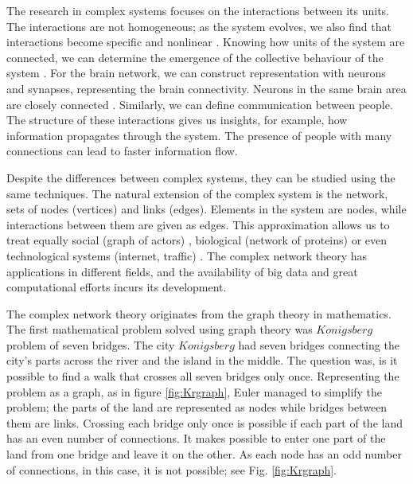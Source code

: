 The research in complex systems focuses on the interactions between its units. The interactions are not homogeneous; as the system evolves, we also find that interactions become specific and nonlinear \cite{thurner2018}. Knowing how units of the system are connected, we can determine the emergence of the collective behaviour of the system \cite{ladyman2013}. For the brain network, we can construct representation with neurons and synapses, representing the brain connectivity. Neurons in the same brain area are closely connected \cite{latora2017complex}.
Similarly, we can define communication between people. The structure of these interactions gives us insights, for example, how information propagates through the system. The presence of people with many connections can lead to faster information flow. 

Despite the differences between complex systems, they can be studied using the same techniques. The natural extension of the complex system is the network, sets of nodes (vertices) and links (edges). Elements in the system are nodes, while interactions between them are given as edges. This approximation allows us to treat equally social \cite{myers2014, sarigol2014} (graph of actors) , biological (network of proteins) \cite{fraiman2009ising, schneider2011modeling} or even technological systems (internet, traffic) \cite{costa2007characterization, costa2011analyzing, newman2003structure}. The complex network theory has applications in different fields, and the availability of big data and great computational efforts incurs its development. 

The complex network theory originates from the graph theory in mathematics. 
The first mathematical problem solved using graph theory was $Konigsberg$ problem of seven bridges. The city $Konigsberg$ had seven bridges connecting the city's parts across the river and the island in the middle. The question was, is it possible to find a walk that crosses all seven bridges only once. Representing the problem as a graph, as in figure \ref{fig:Krgraph}, Euler managed to simplify the problem; the parts of the land are represented as nodes while bridges between them are links. Crossing each bridge only once is possible if each part of the land has an even number of connections. It makes possible to enter one part of the land from one bridge and leave it on the other. As each node has an odd number of connections, in this case, it is not possible; see Fig. \ref{fig:Krgraph}.


